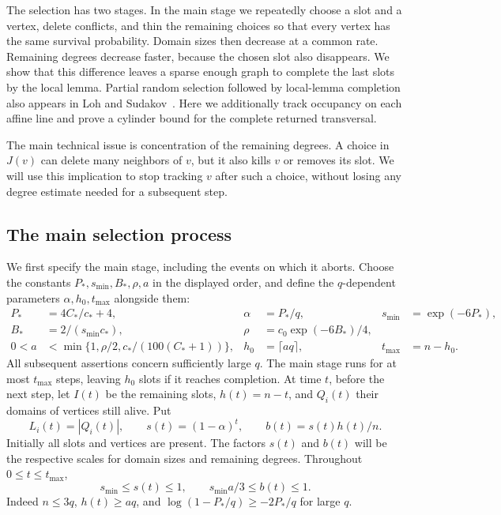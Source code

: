 The selection has two stages.  In the main stage we repeatedly choose a
slot and a vertex, delete conflicts, and thin the remaining choices so
that every vertex has the same survival probability.  Domain sizes then
decrease at a common rate.  Remaining degrees decrease faster, because
the chosen slot also disappears.  We show that this difference leaves a
sparse enough graph to complete the last slots by the local lemma.
Partial random selection followed by local-lemma completion also appears
in Loh and Sudakov~\cite[Section~4]{LohSudakov2007}. Here we additionally
track occupancy on each affine line and prove a cylinder bound for the
complete returned transversal.

The main technical issue is concentration of the remaining degrees.
A choice in $J(v)$ can delete many neighbors of $v$, but it also kills
$v$ or removes its slot.  We will use this implication to stop tracking
$v$ after such a choice, without losing any degree estimate needed for
a subsequent step.

\subsection{The main selection process}

We first specify the main stage, including the events on which it
aborts.  Choose the constants $P_*,s_{\min},B_*,\rho,a$ in the
displayed order, and define the $q$-dependent parameters
$\alpha,h_0,t_{\max}$ alongside them:
\begin{align}
 P_*&=4C_*/c_*+4,& \alpha&=P_*/q,&
 s_{\min}&=\exp(-6P_*),\label{sel:constants-one}\\
 B_*&=2/(s_{\min}c_*),&
 \rho&=c_0\exp(-6B_*)/4,\label{sel:constants-two}\\
 0<a&<\min\{1,\rho/2,c_*/(100(C_*+1))\},&
 h_0&=\lceil aq\rceil,& t_{\max}&=n-h_0.\label{sel:constants-three}
\end{align}
All subsequent assertions concern sufficiently large $q$.  The main
stage runs for at most $t_{\max}$ steps, leaving $h_0$ slots if it
reaches completion.
At time $t$, before the next step, let $I(t)$ be the remaining slots,
$h(t)=n-t$, and $Q_i(t)$ their domains of vertices still alive.  Put
\begin{equation}\label{sel:scales}
 L_i(t)=|Q_i(t)|,\qquad
 s(t)=(1-\alpha)^t,\qquad b(t)=s(t)h(t)/n.
\end{equation}
Initially all slots and vertices are present.  The factors $s(t)$ and
$b(t)$ will be the respective scales for domain sizes and remaining
degrees.  Throughout $0\le t\le t_{\max}$,
\begin{equation}\label{sel:scale-lower}
 s_{\min}\le s(t)\le1,\qquad s_{\min}a/3\le b(t)\le1.
\end{equation}
Indeed $n\le3q$, $h(t)\ge aq$, and
$\log(1-P_*/q)\ge-2P_*/q$ for large $q$.

